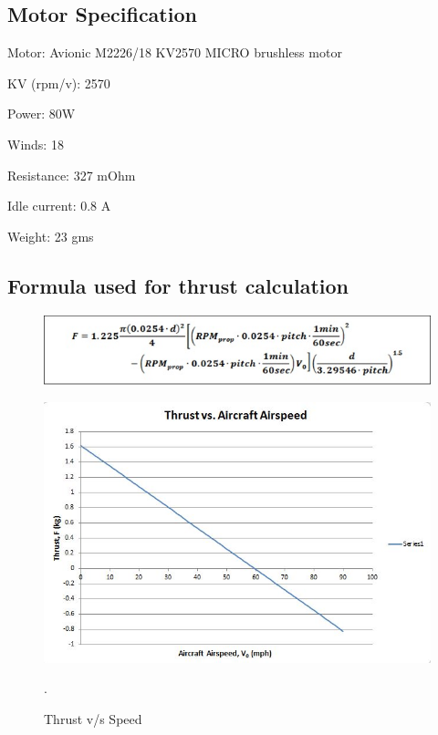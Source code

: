 \subsection{Motor Specification}
\itemize

\item Motor: Avionic M2226/18 KV2570 MICRO brushless motor

\item KV (rpm/v): 2570

\item Power: 80W

\item Winds: 18

\item Resistance: 327 mOhm

\item Idle current: 0.8 A

\item Weight: 23 gms



\subsection{Formula used for thrust calculation}

\begin{figure}[H]
	\centering
	
	\includegraphics[scale=0.8]{thrustformula.jpeg}
	
	\label{fig:boat}
\end{figure}




\begin{figure}[H]
\centering

\includegraphics[scale=0.8]{ThrustGraph.jpeg}
\label{fig:boat}
\caption{\label{fig:Thrust_v/s_speed}Thrust v/s Speed}
.\end{figure}




